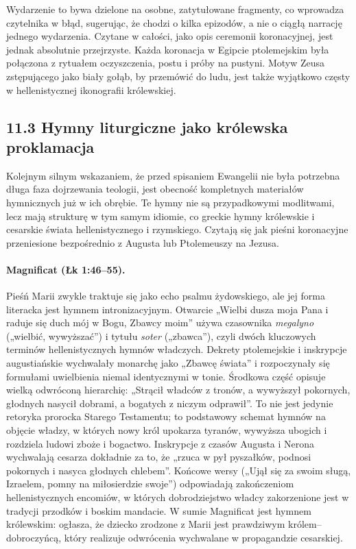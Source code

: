 Wydarzenie to bywa dzielone na osobne, zatytułowane fragmenty, co wprowadza czytelnika w błąd, sugerując, że chodzi o kilka epizodów, a nie o ciągłą narrację jednego wydarzenia.
Czytane w całości, jako opis ceremonii koronacyjnej, jest jednak absolutnie przejrzyste.
Każda koronacja w Egipcie ptolemejskim była połączona z rytuałem oczyszczenia, postu i próby na pustyni.
Motyw Zeusa zstępującego jako biały gołąb, by przemówić do ludu, jest także wyjątkowo częsty w hellenistycznej ikonografii królewskiej.

\subsection{11.3 Hymny liturgiczne jako królewska proklamacja}

\label{subsec:liturgical-hymns-as-royal-proclamation}

Kolejnym silnym wskazaniem, że przed spisaniem Ewangelii nie była potrzebna długa faza dojrzewania teologii, jest obecność kompletnych materiałów hymnicznych już w ich obrębie.
Te hymny nie są przypadkowymi modlitwami, lecz mają strukturę w tym samym idiomie, co greckie hymny królewskie i cesarskie świata hellenistycznego i rzymskiego.
Czytają się jak pieśni koronacyjne przeniesione bezpośrednio z Augusta lub Ptolemeuszy na Jezusa.

\paragraph{Magnificat (Łk 1:46--55).}
Pieśń Marii zwykle traktuje się jako echo psalmu żydowskiego, ale jej forma literacka jest hymnem intronizacyjnym.
Otwarcie „Wielbi dusza moja Pana i raduje się duch mój w Bogu, Zbawcy moim” używa czasownika \emph{megalyno} („wielbić, wywyższać”) i tytułu \emph{soter} („zbawca”), czyli dwóch kluczowych terminów hellenistycznych hymnów władczych.
Dekrety ptolemejskie i inskrypcje augustiańskie wychwalały monarchę jako „Zbawcę świata” i rozpoczynały się formułami uwielbienia niemal identycznymi w tonie.
Środkowa część opisuje wielką odwróconą hierarchię: „Strącił władców z tronów, a wywyższył pokornych, głodnych nasycił dobrami, a bogatych z niczym odprawił”.
To nie jest jedynie retoryka prorocka Starego Testamentu; to podstawowy schemat hymnów na objęcie władzy, w których nowy król upokarza tyranów, wywyższa ubogich i rozdziela ludowi zboże i bogactwo.
Inskrypcje z czasów Augusta i Nerona wychwalają cesarza dokładnie za to, że „rzuca w pył pyszałków, podnosi pokornych i nasyca głodnych chlebem”.
Końcowe wersy („Ujął się za swoim sługą, Izraelem, pomny na miłosierdzie swoje”) odpowiadają zakończeniom hellenistycznych encomiów, w których dobrodziejstwo władcy zakorzenione jest w tradycji przodków i boskim mandacie.
W sumie Magnificat jest hymnem królewskim: ogłasza, że dziecko zrodzone z Marii jest prawdziwym królem–dobroczyńcą, który realizuje odwrócenia wychwalane w propagandzie cesarskiej.

